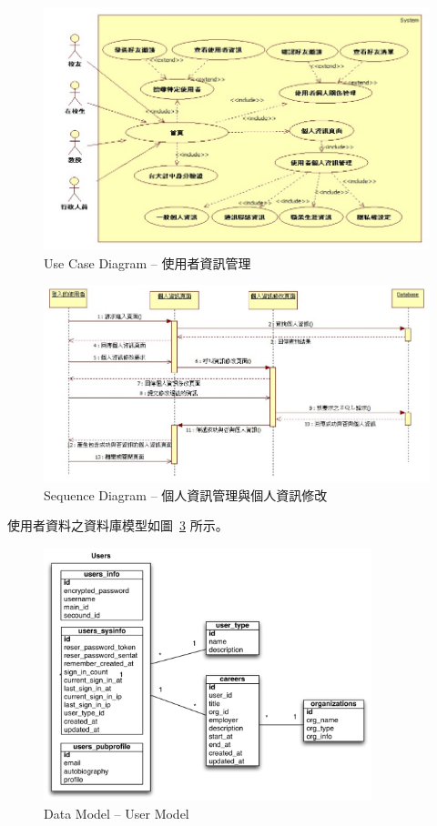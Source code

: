 \begin{figure}[H]
\centering
\includegraphics[width=\textwidth]{img/use01.png}
\caption{Use Case Diagram -- 使用者資訊管理}
\label{pic:use:userLogin}
\end{figure}

\begin{figure}[H]
\centering
\includegraphics[width=\textwidth]{img/seq02.png}
\caption{Sequence Diagram -- 個人資訊管理與個人資訊修改}
\label{pic:seq:profileMgt}
\end{figure}

使用者資料之資料庫模型如圖~\ref{pic:data:user} 所示。

\begin{figure}[H]
\centering
\includegraphics[width=0.85\textwidth]{img/user.pdf}
\caption{Data Model -- User Model}
\label{pic:data:user}
\end{figure}

